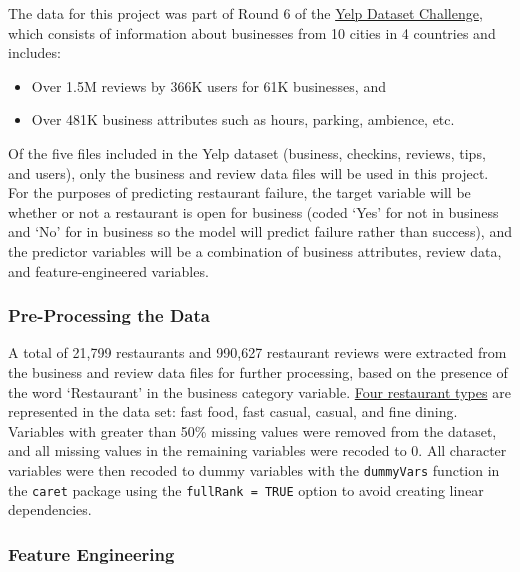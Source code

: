 \documentclass[]{article}
\begin{document}
The data for this project was part of Round 6 of the
\href{http://www.yelp.com/dataset_challenge}{Yelp Dataset Challenge},
which consists of information about businesses from 10 cities in 4
countries and includes:

\begin{itemize}
\itemsep1pt\parskip0pt
\item
  Over 1.5M reviews by 366K users for 61K businesses, and
\item
  Over 481K business attributes such as hours, parking, ambience, etc.
\end{itemize}

Of the five files included in the Yelp dataset (business, checkins,
reviews, tips, and users), only the business and review data files will
be used in this project. For the purposes of predicting restaurant
failure, the target variable will be whether or not a restaurant is open
for business (coded `Yes' for not in business and `No' for in business
so the model will predict failure rather than success), and the
predictor variables will be a combination of business attributes, review
data, and feature-engineered variables.

\subsubsection{Pre-Processing the Data}\label{pre-processing-the-data}

A total of 21,799 restaurants and 990,627 restaurant reviews were
extracted from the business and review data files for further
processing, based on the presence of the word `Restaurant' in the
business category variable.
\href{https://en.wikipedia.org/wiki/Types_of_restaurant}{Four restaurant
types} are represented in the data set: fast food, fast casual, casual,
and fine dining. Variables with greater than 50\% missing values were
removed from the dataset, and all missing values in the remaining
variables were recoded to 0. All character variables were then recoded
to dummy variables with the \texttt{dummyVars} function in the
\texttt{caret} package using the \texttt{fullRank = TRUE} option to
avoid creating linear dependencies.

\subsubsection{Feature Engineering}\label{feature-engineering}
\end{document}
